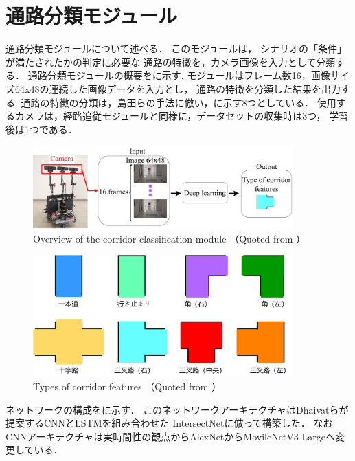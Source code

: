 \clearpage
\section{通路分類モジュール}
\label{sec:intersection}
通路分類モジュールについて述べる．
このモジュールは，
シナリオの「条件」が満たされたかの判定に必要な
通路の特徴を，カメラ画像を入力として分類する．
通路分類モジュールの概要をに示す.
モジュールはフレーム数16，画像サイズ64x48の連続した画像データを入力とし，
通路の特徴を分類した結果を出力する.
通路の特徴の分類は，島田らの手法に倣い，に示す8つとしている．
使用するカメラは，経路追従モジュールと同様に，データセットの収集時は3つ，
学習後は1つである．

\begin{figure}[htbp]
    \centering
     \includegraphics[width=100mm]{images/pdf/intersection_abs.pdf}
     \caption{Overview of the corridor classification module （Quoted from \cite{haruyama2023}）}
     \label{fig:intersection_abs}
\end{figure}
\begin{figure}[htbp]
    \centering
     \includegraphics[width=100mm]{images/pdf/class.pdf}
     \caption{Types of corridor features （Quoted from \cite{haruyama2023}）}
     \label{fig:class}
\end{figure}
\newpage

ネットワークの構成をに示す．
このネットワークアーキテクチャはDhaivatら\cite{lrcn}が提案するCNNとLSTMを組み合わせた
IntersectNetに倣って構築した．
なおCNNアーキテクチャは実時間性の観点からAlexNet\cite{alex}からMovileNetV3-Large\cite{v3}へ変更している．

